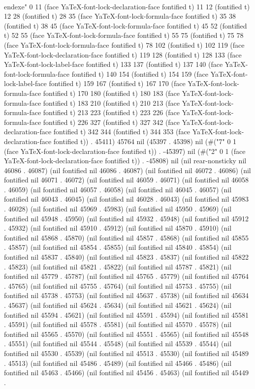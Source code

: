  \\end{exe}" 0 11 (face YaTeX-font-lock-declaration-face fontified t) 11 12 (fontified t) 12 28 (fontified t) 28 35 (face YaTeX-font-lock-formula-face fontified t) 35 38 (fontified t) 38 45 (face YaTeX-font-lock-formula-face fontified t) 45 52 (fontified t) 52 55 (face YaTeX-font-lock-formula-face fontified t) 55 75 (fontified t) 75 78 (face YaTeX-font-lock-formula-face fontified t) 78 102 (fontified t) 102 119 (face YaTeX-font-lock-declaration-face fontified t) 119 128 (fontified t) 128 133 (face YaTeX-font-lock-label-face fontified t) 133 137 (fontified t) 137 140 (face YaTeX-font-lock-formula-face fontified t) 140 154 (fontified t) 154 159 (face YaTeX-font-lock-label-face fontified t) 159 167 (fontified t) 167 170 (face YaTeX-font-lock-formula-face fontified t) 170 180 (fontified t) 180 183 (face YaTeX-font-lock-formula-face fontified t) 183 210 (fontified t) 210 213 (face YaTeX-font-lock-formula-face fontified t) 213 223 (fontified t) 223 226 (face YaTeX-font-lock-formula-face fontified t) 226 327 (fontified t) 327 342 (face YaTeX-font-lock-declaration-face fontified t) 342 344 (fontified t) 344 353 (face YaTeX-font-lock-declaration-face fontified t)) . 45411) 45764 nil (45397 . 45398) nil (#("7" 0 1 (face YaTeX-font-lock-declaration-face fontified t)) . -45397) nil (#("2" 0 1 (face YaTeX-font-lock-declaration-face fontified t)) . -45808) nil (nil rear-nonsticky nil 46086 . 46087) (nil fontified nil 46086 . 46087) (nil fontified nil 46072 . 46086) (nil fontified nil 46071 . 46072) (nil fontified nil 46059 . 46071) (nil fontified nil 46058 . 46059) (nil fontified nil 46057 . 46058) (nil fontified nil 46045 . 46057) (nil fontified nil 46043 . 46045) (nil fontified nil 46028 . 46043) (nil fontified nil 45983 . 46028) (nil fontified nil 45969 . 45983) (nil fontified nil 45950 . 45969) (nil fontified nil 45948 . 45950) (nil fontified nil 45932 . 45948) (nil fontified nil 45912 . 45932) (nil fontified nil 45910 . 45912) (nil fontified nil 45870 . 45910) (nil fontified nil 45868 . 45870) (nil fontified nil 45857 . 45868) (nil fontified nil 45855 . 45857) (nil fontified nil 45854 . 45855) (nil fontified nil 45840 . 45854) (nil fontified nil 45837 . 45840) (nil fontified nil 45823 . 45837) (nil fontified nil 45822 . 45823) (nil fontified nil 45821 . 45822) (nil fontified nil 45787 . 45821) (nil fontified nil 45779 . 45787) (nil fontified nil 45765 . 45779) (nil fontified nil 45764 . 45765) (nil fontified nil 45755 . 45764) (nil fontified nil 45753 . 45755) (nil fontified nil 45738 . 45753) (nil fontified nil 45637 . 45738) (nil fontified nil 45634 . 45637) (nil fontified nil 45624 . 45634) (nil fontified nil 45621 . 45624) (nil fontified nil 45594 . 45621) (nil fontified nil 45591 . 45594) (nil fontified nil 45581 . 45591) (nil fontified nil 45578 . 45581) (nil fontified nil 45570 . 45578) (nil fontified nil 45565 . 45570) (nil fontified nil 45551 . 45565) (nil fontified nil 45548 . 45551) (nil fontified nil 45544 . 45548) (nil fontified nil 45539 . 45544) (nil fontified nil 45530 . 45539) (nil fontified nil 45513 . 45530) (nil fontified nil 45489 . 45513) (nil fontified nil 45486 . 45489) (nil fontified nil 45466 . 45486) (nil fontified nil 45463 . 45466) (nil fontified nil 45456 . 45463) (nil fontified nil 45449 . 
